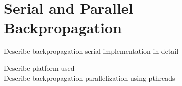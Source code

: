 \section{Serial and Parallel Backpropagation}
\label{BackProp}

Describe backpropagation serial implementation in detail

Describe platform used \\
Describe backpropagation parallelization using pthreads
